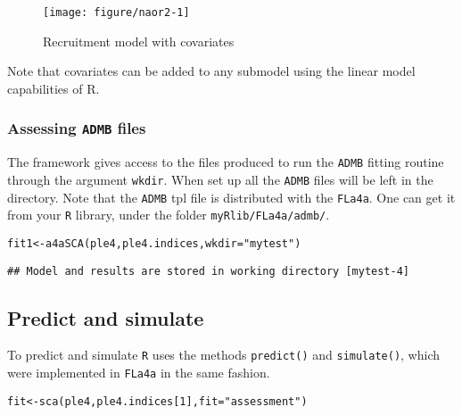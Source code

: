 \documentclass[a4paper,english,10pt]{article}\usepackage[]{graphicx}\usepackage[]{color}
\makeatletter
\def\maxwidth{ %
  \ifdim\Gin@nat@width>\linewidth
    \linewidth
  \else
    \Gin@nat@width
  \fi
}
\newcommand{\hlnum}[1]{\textcolor[rgb]{0.2,0.2,0.2}{#1}}%
\newcommand{\hlstr}[1]{\textcolor[rgb]{0.2,0.2,0.2}{#1}}%
\newcommand{\hlstd}[1]{\textcolor[rgb]{0,0,0}{#1}}%
\newcommand{\hlkwb}[1]{\textcolor[rgb]{0.361,0.506,0.596}{#1}}%
\newcommand{\hlkwc}[1]{\textcolor[rgb]{0.361,0.506,0.596}{#1}}%
\newcommand{\hlkwd}[1]{\textcolor[rgb]{0.361,0.506,0.596}{#1}}%
\newenvironment{kframe}{%
 \def\at@end@of@kframe{}%
 \ifinner\ifhmode%
  \def\at@end@of@kframe{\end{minipage}}%
  \begin{minipage}{\columnwidth}%
 \fi\fi%
 \def\FrameCommand##1{\hskip\@totalleftmargin \hskip-\fboxsep
 \colorbox{shadecolor}{##1}\hskip-\fboxsep
     \hskip-\linewidth \hskip-\@totalleftmargin \hskip\columnwidth}%
 \MakeFramed {\advance\hsize-\width
   \@totalleftmargin\z@ \linewidth\hsize
   \@setminipage}}%
 {\par\unskip\endMakeFramed%
 \at@end@of@kframe}
\newenvironment{knitrout}{}{} %
\newcommand{\code}[1]{{\texttt{#1}}}
\newcommand{\pkg}[1]{{\texttt{#1}}}
\makeatother
\begin{document}
\begin{knitrout}
\color{fgcolor}\begin{figure}[H]

{\centering \texttt{[image: figure/naor2-1]} 

}

\caption[Recruitment model with covariates]{Recruitment model with covariates}\label{fig:naor2}
\end{figure}


\end{knitrout}

Note that covariates can be added to any submodel using the linear model capabilities of R.

\subsubsection{Assessing \pkg{ADMB} files}

The framework gives access to the files produced to run the \pkg{ADMB} fitting routine through the argument \code{wkdir}. When set up all the \pkg{ADMB} files will be left in the directory. Note that the \pkg{ADMB} tpl file is distributed with the \pkg{FLa4a}. One can get it from your \pkg{R} library, under the folder \code{myRlib/FLa4a/admb/}.

\begin{knitrout}
\color{fgcolor}\begin{kframe}
\begin{alltt}
\hlstd{fit1} \hlkwb{<-} \hlkwd{a4aSCA}\hlstd{(ple4, ple4.indices,} \hlkwc{wkdir}\hlstd{=}\hlstr{"mytest"}\hlstd{)}
\end{alltt}
\begin{verbatim}
## Model and results are stored in working directory [mytest-4]
\end{verbatim}
\end{kframe}
\end{knitrout}

\subsection{Predict and simulate}

To predict and simulate \pkg{R} uses the methods \code{predict()} and \code{simulate()}, which were implemented in \pkg{FLa4a} in the same fashion.

\begin{knitrout}
\color{fgcolor}\begin{kframe}
\begin{alltt}
\hlstd{fit} \hlkwb{<-} \hlkwd{sca}\hlstd{(ple4, ple4.indices[}\hlnum{1}\hlstd{],} \hlkwc{fit}\hlstd{=}\hlstr{"assessment"}\hlstd{)}
\end{alltt}
\end{kframe}
\end{knitrout}
\end{document}
